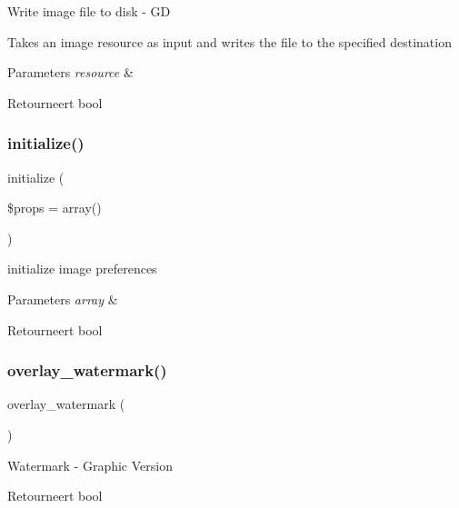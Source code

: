 Write image file to disk -\/ GD

Takes an image resource as input and writes the file to the specified destination


\begin{DoxyParams}{Parameters}
{\em resource} & \\
\hline
\end{DoxyParams}
\begin{DoxyReturn}{Retourneert}
bool 
\end{DoxyReturn}
\mbox{\label{class_c_i___image__lib_a0bccf32e3d2d283de0521949330cb969}} 
\subsubsection{\texorpdfstring{initialize()}{initialize()}}
{\footnotesize\ttfamily initialize (\begin{DoxyParamCaption}\item[{}]{\$props = {\ttfamily array()} }\end{DoxyParamCaption})}

initialize image preferences


\begin{DoxyParams}{Parameters}
{\em array} & \\
\hline
\end{DoxyParams}
\begin{DoxyReturn}{Retourneert}
bool 
\end{DoxyReturn}
\mbox{\label{class_c_i___image__lib_a7fa0fd0aabe26803d61d7e09c1cb73de}} 
\subsubsection{\texorpdfstring{overlay\_watermark()}{overlay\_watermark()}}
{\footnotesize\ttfamily overlay\+\_\+watermark (\begin{DoxyParamCaption}{ }\end{DoxyParamCaption})}

Watermark -\/ Graphic Version

\begin{DoxyReturn}{Retourneert}
bool 
\end{DoxyReturn}
\mbox{\label{class_c_i___image__lib_a94e38a7d478ce07200a52c51497e598e}} 
